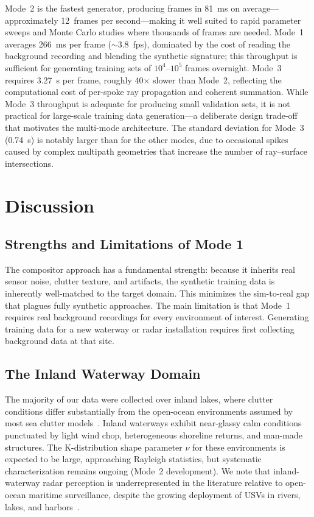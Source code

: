 \documentclass[twocolumn, 10pt]{article}
\begin{document}
Mode~2 is the fastest generator, producing frames in \SI{81}{\milli\second} on average---approximately 12~frames per second---making it well suited to rapid parameter sweeps and Monte Carlo studies where thousands of frames are needed. Mode~1 averages \SI{266}{\milli\second} per frame (${\sim}$3.8~fps), dominated by the cost of reading the background recording and blending the synthetic signature; this throughput is sufficient for generating training sets of $10^{4}$--$10^{5}$ frames overnight. Mode~3 requires \SI{3.27}{\second} per frame, roughly 40$\times$ slower than Mode~2, reflecting the computational cost of per-spoke ray propagation and coherent summation. While Mode~3 throughput is adequate for producing small validation sets, it is not practical for large-scale training data generation---a deliberate design trade-off that motivates the multi-mode architecture. The standard deviation for Mode~3 (\SI{0.74}{\second}) is notably larger than for the other modes, due to occasional spikes caused by complex multipath geometries that increase the number of ray--surface intersections.

\section{Discussion}
\label{sec:discussion}

\subsection{Strengths and Limitations of Mode 1}

The compositor approach has a fundamental strength: because it inherits real sensor noise, clutter texture, and artifacts, the synthetic training data is inherently well-matched to the target domain. This minimizes the sim-to-real gap that plagues fully synthetic approaches. The main limitation is that Mode~1 requires real background recordings for every environment of interest. Generating training data for a new waterway or radar installation requires first collecting background data at that site.

\subsection{The Inland Waterway Domain}

The majority of our data were collected over inland lakes, where clutter conditions differ substantially from the open-ocean environments assumed by most sea clutter models~\cite{ward2013sea}. Inland waterways exhibit near-glassy calm conditions punctuated by light wind chop, heterogeneous shoreline returns, and man-made structures. The K-distribution shape parameter $\nu$ for these environments is expected to be large, approaching Rayleigh statistics, but systematic characterization remains ongoing (Mode~2 development). We note that inland-waterway radar perception is underrepresented in the literature relative to open-ocean maritime surveillance, despite the growing deployment of USVs in rivers, lakes, and harbors~\cite{cheng2021robust}.
\end{document}
